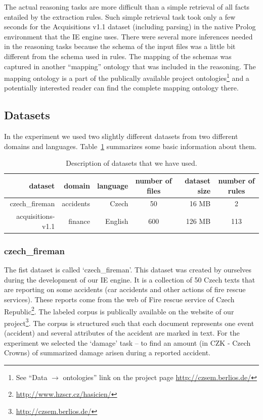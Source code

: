 The actual reasoning tasks are more difficult than a simple retrieval of all facts entailed by the extraction rules. Such simple retrieval task took only a few seconds for the Acquisitions v1.1 dataset (including parsing) in the native Prolog environment that the IE engine uses. There were several more inferences needed in the reasoning tasks because the schema of the input files was a little bit different from the schema used in rules. The mapping of the schemas was captured in another ``mapping'' ontology that was included in the reasoning. The mapping ontology is a part of the publically available project ontologies\footnote{See ``Data $\rightarrow$ ontologies'' link on the project page \url{http://czsem.berlios.de/}} and a potentially interested reader can find the complete mapping ontology there.


\subsection{Datasets}

In the experiment we used two slightly different datasets from two different domains and languages.  Table~\ref{tab:datasets} summarizes some basic information about them.

\begin{table}
\centering
\begin{tabular}{|r||r|r|c|r|c|}
\hline
dataset & domain & language & number of files & dataset size & number of rules\\
\hline
\hline
czech\_fireman & accidents & Czech & 50 & 16 MB & 2\\
\hline
acquisitions-v1.1 & finance & English & 600 & 126 MB & 113\\
\hline
\end{tabular}
\caption{Description of datasets that we have used.}
\label{tab:datasets}
\end{table}


\subsubsection{czech\_fireman}


The fist dataset is called `czech\_fireman'. This dataset was created by ourselves during the development of our IE  engine. It is a collection of 50 Czech texts that are reporting on some accidents (car accidents and other actions of fire rescue services). These reports come from the web of Fire rescue service of Czech Republic\footnote{\url{http://www.hzscr.cz/hasicien/}}. The labeled corpus is publically available on the website of our project\footnote{\url{http://czsem.berlios.de/}}.
The corpus is structured such that each document represents one event (accident) and several attributes of the accident are marked in text. For the experiment we selected the `damage' task -- to find an amount (in CZK - Czech Crowns) of summarized damage arisen during a reported accident.






